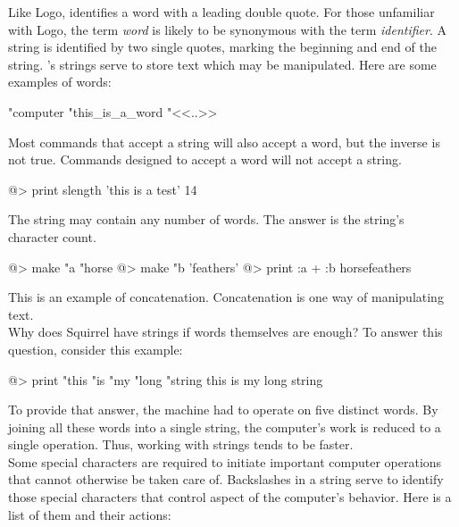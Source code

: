 Like Logo, \squirrel identifies a word with a leading double quote.  For those unfamiliar with Logo, the term {\em word} is likely to be synonymous with the term {\em identifier}. A string is identified by two single quotes, marking the beginning and end of the string.  \squirrel's strings serve to store text which may be manipulated.   
Here are some examples of words:  

\begin{verbatimtab}
"computer
"this_is_a_word
"<<..>>
\end{verbatimtab}
 
Most commands that accept a string will also accept a word, but the inverse is not true.  Commands designed to accept a word will not accept a string.
  
\begin{verbatimtab}
@> print slength 'this is a test' 
14
\end{verbatimtab}
 
The string may contain any number of words.  The answer is the string's character count. 
 
\begin{verbatimtab}
@> make "a "horse
@> make "b 'feathers'
@> print :a + :b 
horsefeathers
\end{verbatimtab} 

This is an example of concatenation.  Concatenation is one way of manipulating text.\\
  
Why does Squirrel have strings if words themselves are enough?  To answer this question, consider this example:

\begin{verbatimtab}
@> print "this "is "my "long "string  
this is my long string
\end{verbatimtab}
 
To provide that answer, the machine had to operate on five distinct words.  By joining all these words into a single string, the computer's work is reduced to a single operation.  Thus, working with strings tends to be faster.\\ 
 
Some special characters are required to initiate important computer operations that cannot otherwise be taken care of.  Backslashes in a string serve to identify those special characters that control aspect of the computer's behavior.  Here is a list of them and their actions: 
 
